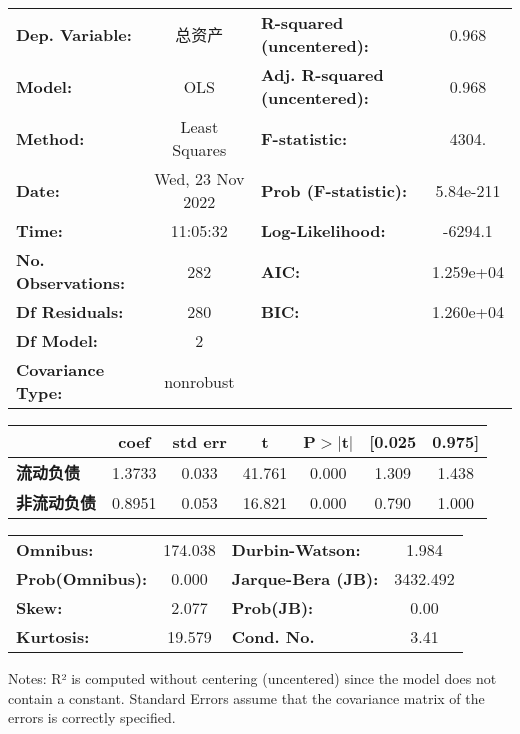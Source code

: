 \begin{center}
\begin{tabular}{lclc}
\toprule
\textbf{Dep. Variable:}    &       总资产        & \textbf{  R-squared (uncentered):}      &     0.968   \\
\textbf{Model:}            &       OLS        & \textbf{  Adj. R-squared (uncentered):} &     0.968   \\
\textbf{Method:}           &  Least Squares   & \textbf{  F-statistic:       }          &     4304.   \\
\textbf{Date:}             & Wed, 23 Nov 2022 & \textbf{  Prob (F-statistic):}          & 5.84e-211   \\
\textbf{Time:}             &     11:05:32     & \textbf{  Log-Likelihood:    }          &   -6294.1   \\
\textbf{No. Observations:} &         282      & \textbf{  AIC:               }          & 1.259e+04   \\
\textbf{Df Residuals:}     &         280      & \textbf{  BIC:               }          & 1.260e+04   \\
\textbf{Df Model:}         &           2      & \textbf{                     }          &             \\
\textbf{Covariance Type:}  &    nonrobust     & \textbf{                     }          &             \\
\bottomrule
\end{tabular}
\begin{tabular}{lcccccc}
               & \textbf{coef} & \textbf{std err} & \textbf{t} & \textbf{P$> |$t$|$} & \textbf{[0.025} & \textbf{0.975]}  \\
\midrule
\textbf{流动负债}  &       1.3733  &        0.033     &    41.761  &         0.000        &        1.309    &        1.438     \\
\textbf{非流动负债} &       0.8951  &        0.053     &    16.821  &         0.000        &        0.790    &        1.000     \\
\bottomrule
\end{tabular}
\begin{tabular}{lclc}
\textbf{Omnibus:}       & 174.038 & \textbf{  Durbin-Watson:     } &    1.984  \\
\textbf{Prob(Omnibus):} &   0.000 & \textbf{  Jarque-Bera (JB):  } & 3432.492  \\
\textbf{Skew:}          &   2.077 & \textbf{  Prob(JB):          } &     0.00  \\
\textbf{Kurtosis:}      &  19.579 & \textbf{  Cond. No.          } &     3.41  \\
\bottomrule
\end{tabular}
\end{center}

Notes: \newline
 [1] R² is computed without centering (uncentered) since the model does not contain a constant. \newline
 [2] Standard Errors assume that the covariance matrix of the errors is correctly specified.